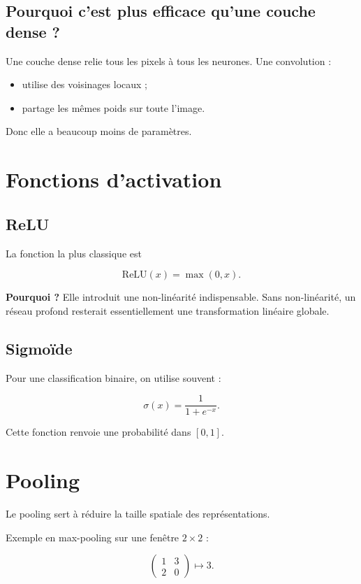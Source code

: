 ﻿\documentclass[11pt,a4paper]{article}
\begin{document}
\subsection{Pourquoi c’est plus efficace qu’une couche dense ?}

Une couche dense relie tous les pixels à tous les neurones.
Une convolution :
\begin{itemize}
    \item utilise des voisinages locaux ;
    \item partage les mêmes poids sur toute l’image.
\end{itemize}

Donc elle a beaucoup moins de paramètres.

\section{Fonctions d’activation}

\subsection{ReLU}

La fonction la plus classique est

\[
\mathrm{ReLU}(x)=\max(0,x).
\]

\textbf{Pourquoi ?}  
Elle introduit une non-linéarité indispensable. Sans non-linéarité, un réseau profond resterait essentiellement une transformation linéaire globale.

\subsection{Sigmoïde}

Pour une classification binaire, on utilise souvent :

\[
\sigma(x)=\frac{1}{1+e^{-x}}.
\]

Cette fonction renvoie une probabilité dans $[0,1]$.

\section{Pooling}

Le pooling sert à réduire la taille spatiale des représentations.

Exemple en max-pooling sur une fenêtre $2\times 2$ :

\[
\begin{pmatrix}
1 & 3 \\
2 & 0
\end{pmatrix}
\mapsto 3.
\]
\end{document}

